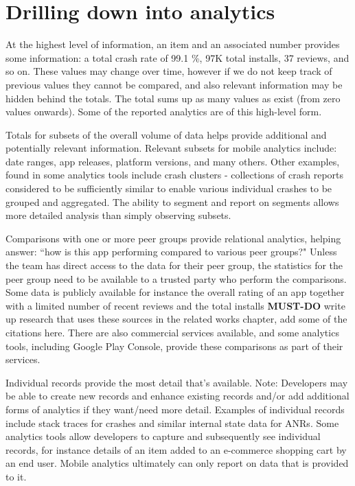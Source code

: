 \section{Drilling down into analytics}\label{section-drilling-down-into-analytics}
At the highest level of information, an item and an associated number provides some information: a total crash rate of 99.1 \%, 97K total installs, 37 reviews, and so on. These values may change over time, however if we do not keep track of previous values they cannot be compared, and also relevant information may be hidden behind the totals. The total sums up as many values as exist (from zero values onwards). Some of the reported analytics are of this high-level form.

Totals for subsets of the overall volume of data helps provide additional and potentially relevant information. Relevant subsets for mobile analytics include: date ranges, app releases, platform versions, and many others. Other examples, found in some analytics tools include crash clusters - collections of crash reports considered to be sufficiently similar to enable various individual crashes to be grouped and aggregated. The ability to segment and report on segments allows more detailed analysis than simply observing subsets. 

Comparisons with one or more peer groups provide relational analytics, helping answer: ``how is this app performing compared to various peer groups?" Unless the team has direct access to the data for their peer group, the statistics for the peer group need to be available to a trusted party who perform the comparisons. Some data is publicly available for instance the overall rating of an app together with a limited number of recent reviews and the total installs \textbf{MUST-DO} write up research that uses these sources in the related works chapter, add some of the citations here. There are also commercial services available, and some analytics tools, including Google Play Console, provide these comparisons as part of their services.

Individual records provide the most detail that's available. Note: Developers may be able to create new records and enhance existing records and/or add additional forms of analytics if they want/need more detail. Examples of individual records include stack traces for crashes and similar internal state data for ANRs. Some analytics tools allow developers to capture and subsequently see individual records, for instance details of an item added to an e-commerce shopping cart by an end user. Mobile analytics ultimately can only report on data that is provided to it. 

